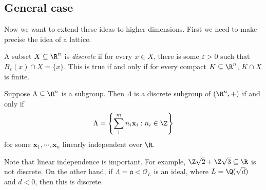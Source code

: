 \documentclass[a4paper]{article}
\begin{document}
\subsection{General case}
Now we want to extend these ideas to higher dimensions. First we need to make precise the idea of a lattice.
\begin{defi}
  A subset $X \subseteq \R^n$ is \emph{discrete} if for every $x \in X$, there is some $\varepsilon > 0$ such that $B_\varepsilon(x) \cap X = \{x\}$. This is true if and only if for every compact $K \subseteq \R^n$, $K\cap X$ is finite.
\end{defi}

\begin{prop}
  Suppose $\Lambda \subseteq \R^n$ is a subgroup. Then $\Lambda$ is a discrete subgroup of $(\R^n, +)$ if and only if
  \[
    \Lambda = \left\{\sum_1^m n_i \mathbf{x}_i : n_i \in \Z\right\}
  \]
  for some $\mathbf{x}_1, \cdots, \mathbf{x}_n$ linearly independent over $\R$.
\end{prop}

Note that linear independence is important. For example, $\Z \sqrt{2} + \Z \sqrt{3} \subseteq \R$ is not discrete. On the other hand, if $\Lambda = \mathfrak{a} \lhd \mathcal{O}_L$ is an ideal, where $L = \Q(\sqrt{d})$ and $d < 0$, then this is discrete.
\end{document}
